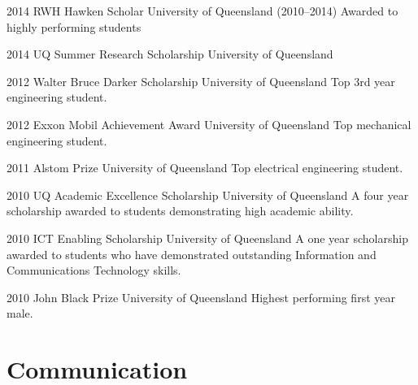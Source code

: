 \begin{entrylist}
	\entryInlineSmall
	{2014}
	{RWH Hawken Scholar}
	{University of Queensland}
	{(2010--2014) Awarded to highly performing students}
\end{entrylist}
\begin{entrylist}
	\entryInlineSmall
	{2014}
	{UQ Summer Research Scholarship}
	{University of Queensland}
	{}
\end{entrylist}
\begin{entrylist}
	\entryInlineSmall
	{2012}
	{Walter Bruce Darker Scholarship}
	{University of Queensland}
	{Top 3rd year engineering student.}
\end{entrylist}
\begin{entrylist}
	\entryInline
	{2012}
	{Exxon Mobil Achievement Award}
	{University of Queensland}
	{Top mechanical engineering student.}
\end{entrylist}
\begin{entrylist}
	\entryInline
	{2011}
	{Alstom Prize}
	{University of Queensland}
	{Top electrical engineering student.}
\end{entrylist}
\begin{entrylist}
	\entryInlineSmall
	{2010}
	{UQ Academic Excellence Scholarship}
	{University of Queensland}
	{A four year scholarship awarded to students demonstrating high academic ability.}
\end{entrylist}
\begin{entrylist}
	\entryInlineSmall
	{2010}
	{ICT Enabling Scholarship}
	{University of Queensland}
	{A one year scholarship awarded to students who have demonstrated outstanding Information and Communications Technology skills.}
\end{entrylist}
\begin{entrylist}
	\entryInlineSmall
	{2010}
	{John Black Prize}
	{University of Queensland}
	{Highest performing first year male.}
\end{entrylist}












\section{Communication}

